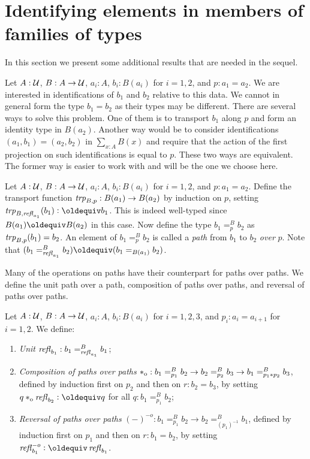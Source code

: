 \documentclass[a4paper,12pt]{amsart}
\begin{document}
\section{Identifying elements in members of families of types}
\label{sec:pathovers}

In this section we present some additional results that are needed in the sequel.

Let $A : \mathcal{U}$, $B : A \to \mathcal{U}$, $a_i:A$, $b_i:B(a_i)$ for $i=1,2$, and $p : a_1 = a_2$.
We are interested in identifications of $b_1$ and $b_2$ relative to this data.
We cannot in general form the type $b_1 = b_2$ as their types may be different.
There are several ways to solve this problem. One of them is to transport $b_1$ along
$p$ and form an identity type in $B(a_2)$. Another way would be to consider
identifications $(a_1,b_1) = (a_2,b_2)$ in $\sum_{x:A} B(x)$ and require that the
action of the first projection on such identifications is equal to $p$. 
These two ways are equivalent.
The former way is easier to work with and will be the one we choose here.

\begin{definition}\label{def:pathover}
Let $A : \mathcal{U}$, $B : A \to \mathcal{U}$, $a_i:A$, $b_i:B(a_i)$ for $i=1,2$, and $p : a_1 = a_2$.
Define the transport function $\mathop{\mathit{trp}_{B,p}} : B(a_1)\to B(a_2)$ by induction on $p$,
setting $\trp{B,\refl{a_1}}(b_1)\defeq b_1$. This is indeed well-typed since
$B(a_1)\jdeq B(a_2)$ in this case.
Now define the type $b_1 =^B_p b_2$ as $\mathop{\mathit{trp}_{B,p}}(b_1) = b_2$.
An element of $b_1 =^B_p b_2$ is called
a \emph{path} from $b_1$ to $b_2$ \emph{over} $p$.
Note that $(b_1 =^B_{\refl{a_1}} b_2) \jdeq (b_1 =_{B(a_1)}  b_2)$.
\end{definition}

Many of the operations on paths have their counterpart for paths over paths.
We define the unit path over a path, composition of paths over paths, and reversal of paths over paths.

\begin{definition}\label{def:pathoveralgebra}
  Let $A : \mathcal{U}$, $B : A \to \mathcal{U}$, $a_i:A$, $b_i:B(a_i)$ for $i=1,2,3$, and 
  $p_i : a_i = a_{i+1}$ for $i=1,2$. We define:
  \begin{enumerate}[topsep=3pt]
  \item \emph{Unit} $\mathop{{\it refl}_{b_1}} : b_1 =^B_{\mathop{{\it refl}_{a_1}}} b_1$;
  \item \emph{Composition of paths over paths} $*_{\mathrm{o}} : b_1 =^B_{p_1} b_2 \to b_2 =^B_{p_2} b_3 \to b_1 =^B_{p_1 * p_2} b_3$,
    defined by induction first on $p_2$ and then on $r: b_2 = b_3$, by
    setting $q \cto \refl{b_2} \defeq q$ for all $q: b_1 =^B_{p_1} b_2$;
  \item \emph{Reversal of paths over paths} $({-})^{-o} : b_1 =^B_{p_1} b_2 \to b_2 =^B_{(p_1)^{-1}} b_1$,
    defined by induction first on $p_1$ and then on $r: b_1 = b_2$, by
    setting $\refloi{b_1} \defeq \refl{b_1}$.
  \end{enumerate}
\end{definition}
\end{document}
